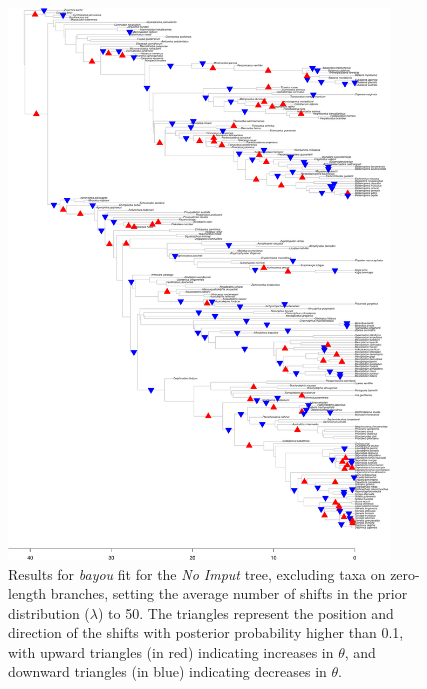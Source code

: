 \begin{figure}[H]
\includegraphics[width=0.9\textwidth]{img/plots-noimput-k50-1.pdf}
\caption{Results for \textit{bayou} fit for the \textit{No Imput} tree, excluding taxa on zero-length branches, setting the average number of shifts in the prior distribution ($\lambda$) to 50. The triangles represent the position and direction of the shifts with posterior probability higher than 0.1, with upward triangles (in red) indicating increases in $\theta$, and downward triangles (in blue) indicating decreases in $\theta$.}
\label{fig:noimput-k50-nzlb}
\end{figure}

\newpage

